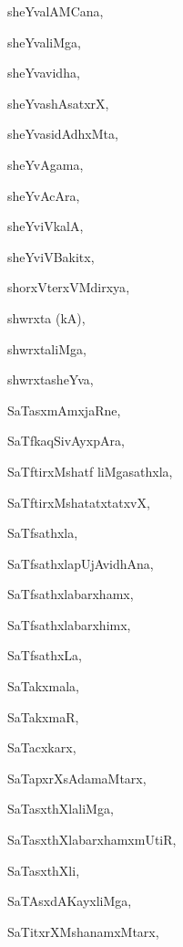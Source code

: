 \begin{multicols}{2}
{sheYvalAMCana}, \pageref{sheYvalAMCana}

{sheYvaliMga}, \pageref{sheYvaliMga}

{sheYvavidha}, \pageref{sheYvavidha}

{sheYvashAsatxrX}, \pageref{sheYvashAsatxrX}

{sheYvasidAdhxMta}, \pageref{sheYvasidAdhxMta}

{sheYvAgama}, \pageref{sheYvAgama}

{sheYvAcAra}, \pageref{sheYvAcAra}

{sheYviVkalA}, \pageref{sheYviVkalA}

{sheYviVBakitx}, \pageref{sheYviVBakitx}

{shorxVterxVMdirxya}, \pageref{shorxVterxVMdirxya}

{shwrxta (kA)}, \pageref{shwrxtakA}

{shwrxtaliMga}, \pageref{shwrxtaliMga}

{shwrxtasheYva}, \pageref{shwrxtasheYva}

{SaTasxmAmxjaRne}, \pageref{SaTasxmAmxjaRne}

{SaTfkaqSivAyxpAra}, \pageref{SaTfkaqSivAyxpAra}

{SaTftirxMshatf liMgasathxla}, \pageref{SaTftirxMshatfliMgasathxla}

{SaTftirxMshatatxtatxvX}, \pageref{SaTftirxMshatatxtatxvX}

{SaTfsathxla}, \pageref{SaTfsathxla}

{SaTfsathxlapUjAvidhAna}, \pageref{SaTfsathxlapUjAvidhAna}

{SaTfsathxlabarxhamx}, \pageref{SaTfsathxlabarxhamx}

{SaTfsathxlabarxhimx}, \pageref{SaTfsathxlabarxhimx}

{SaTfsathxLa}, \pageref{SaTfsathxLa}

{SaTakxmala}, \pageref{SaTakxmala}

{SaTakxmaR}, \pageref{SaTakxmaR}

{SaTacxkarx}, \pageref{SaTacxkarx}

{SaTapxrXsAdamaMtarx}, \pageref{SaTapxrXsAdamaMtarx}

{SaTasxthXlaliMga}, \pageref{SaTasxthXlaliMga}

{SaTasxthXlabarxhamxmUtiR}, \pageref{SaTasxthXlabarxhamxmUtiR}

{SaTasxthXli}, \pageref{SaTasxthXli}

{SaTAsxdAKayxliMga}, \pageref{SaTAsxdAKayxliMga}

{SaTitxrXMshanamxMtarx}, \pageref{SaTitxrXMshanamxMtarx}


\end{multicols}
